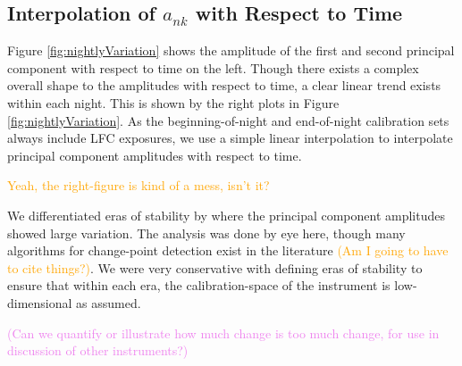 \documentclass[modern]{aastex63}
\newcommand{\lz}[1]{\textcolor{orange}{#1}}
\newcommand{\mb}[1]{\textcolor{violet}{#1}}
\begin{document}
\subsection{Interpolation of $a_{nk}$ with Respect to Time}
\label{sec:choice_avt}
Figure \ref{fig:nightlyVariation} shows the amplitude of the first and second principal component with respect to time on the left.  Though there exists a complex overall shape to the amplitudes with respect to time, a clear linear trend exists within each night.  This is shown by the right plots in Figure  \ref{fig:nightlyVariation}.  As the beginning-of-night and end-of-night calibration sets always include LFC exposures, we use a simple linear interpolation to interpolate principal component amplitudes with respect to time.

\lz{Yeah, the right-figure is kind of a mess, isn't it?}

We differentiated eras of stability by where the principal component amplitudes showed large variation.  The analysis was done by eye here, though many algorithms for change-point detection exist in the literature \lz{(Am I going to have to cite things?)}.  We were very conservative with defining eras of stability to ensure that within each era, the calibration-space of the instrument is low-dimensional as assumed.

\mb{(Can we quantify or illustrate how much change is too much change, for use in discussion of other instruments?)}
\end{document}
